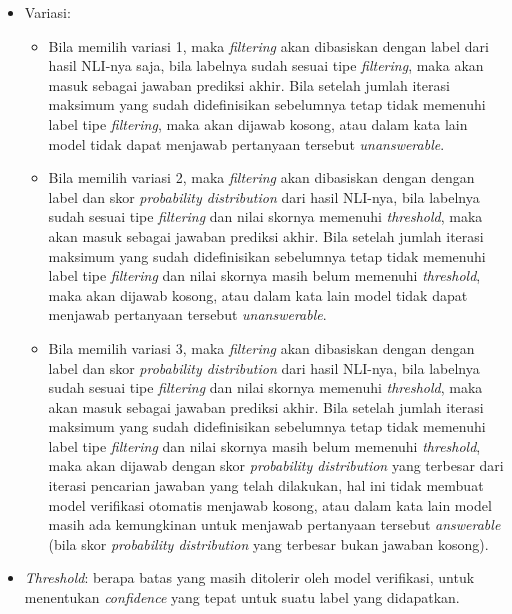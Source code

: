 \begin{itemize}
    \item Variasi:
    \begin{itemize}
        \item Bila memilih variasi 1, maka \emph{filtering} akan dibasiskan dengan label dari hasil NLI-nya saja, bila labelnya sudah sesuai tipe \emph{filtering}, maka akan masuk sebagai jawaban prediksi akhir. Bila setelah jumlah iterasi maksimum yang sudah didefinisikan sebelumnya tetap tidak memenuhi label tipe \emph{filtering}, maka akan dijawab kosong, atau dalam kata lain model tidak dapat menjawab pertanyaan tersebut \emph{unanswerable}.
        
        \item Bila memilih variasi 2, maka \emph{filtering} akan dibasiskan dengan dengan label dan skor \emph{probability distribution} dari hasil NLI-nya, bila labelnya sudah sesuai tipe \emph{filtering} dan nilai skornya memenuhi \emph{threshold}, maka akan masuk sebagai jawaban prediksi akhir. Bila setelah jumlah iterasi maksimum yang sudah didefinisikan sebelumnya tetap tidak memenuhi label tipe \emph{filtering} dan nilai skornya masih belum memenuhi \emph{threshold}, maka akan dijawab kosong, atau dalam kata lain model tidak dapat menjawab pertanyaan tersebut \emph{unanswerable}.
        
        \item Bila memilih variasi 3, maka \emph{filtering} akan dibasiskan dengan dengan label dan skor \emph{probability distribution} dari hasil NLI-nya, bila labelnya sudah sesuai tipe \emph{filtering} dan nilai skornya memenuhi \emph{threshold}, maka akan masuk sebagai jawaban prediksi akhir. Bila setelah jumlah iterasi maksimum yang sudah didefinisikan sebelumnya tetap tidak memenuhi label tipe \emph{filtering} dan nilai skornya masih belum memenuhi \emph{threshold}, maka akan dijawab dengan skor \emph{probability distribution} yang terbesar dari iterasi pencarian jawaban yang telah dilakukan, hal ini tidak membuat model verifikasi otomatis menjawab kosong, atau dalam kata lain model masih ada kemungkinan untuk menjawab pertanyaan tersebut \emph{answerable} (bila skor \emph{probability distribution} yang terbesar bukan jawaban kosong). 
    \end{itemize}
    
    \item \emph{Threshold}: berapa batas yang masih ditolerir oleh model verifikasi, untuk menentukan \emph{confidence} yang tepat untuk suatu label yang didapatkan.
\end{itemize}

